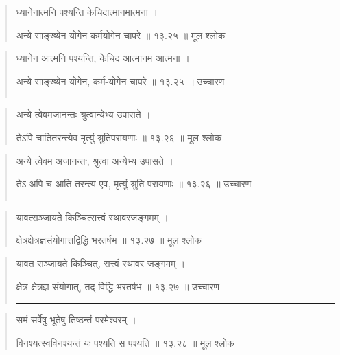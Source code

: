 \begin{quotation}

ध्यानेनात्मनि पश्यन्ति केचिदात्मानमात्मना  ।  

अन्ये साङ्‍ख्येन योगेन कर्मयोगेन चापरे  ॥ १३.२५ ॥  मूल श्लोक
\end{quotation}

\begin{quotation}

ध्यानेन आत्मनि पश्यन्ति, केचिद आत्मानम आत्मना  ।  

अन्ये साङ्‍ख्येन योगेन, कर्म-योगेन चापरे  ॥ १३.२५ ॥  उच्चारण

\noindent\rule{16cm}{0.4pt} 
\end{quotation}


\begin{quotation}

अन्ये त्वेवमजानन्तः श्रुत्वान्येभ्य उपासते  ।  

तेऽपि चातितरन्त्येव मृत्युं श्रुतिपरायणाः  ॥ १३.२६ ॥  मूल श्लोक
\end{quotation}

\begin{quotation}

अन्ये त्वेवम अजानन्तः, श्रुत्वा अन्येभ्य उपासते  ।  

तेऽ अपि च आति-तरन्त्य एव, मृत्युं श्रुति-परायणाः  ॥ १३.२६ ॥  उच्चारण

\noindent\rule{16cm}{0.4pt} 
\end{quotation}


\begin{quotation}

यावत्सञ्जायते किञ्चित्सत्त्वं स्थावरजङ्गमम्‌  ।  

क्षेत्रक्षेत्रज्ञसंयोगात्तद्विद्धि भरतर्षभ  ॥ १३.२७ ॥  मूल श्लोक
\end{quotation}

\begin{quotation}

यावत सञ्जायते किञ्चित्, सत्त्वं स्थावर जङ्गमम्‌  ।  

क्षेत्र क्षेत्रज्ञ संयोगात्, तद् विद्धि भरतर्षभ  ॥ १३.२७ ॥  उच्चारण

\noindent\rule{16cm}{0.4pt} 
\end{quotation}


\begin{quotation}

समं सर्वेषु भूतेषु तिष्ठन्तं परमेश्वरम्‌  ।  

विनश्यत्स्वविनश्यन्तं यः पश्यति स पश्यति  ॥ १३.२८ ॥  मूल श्लोक
\end{quotation}

